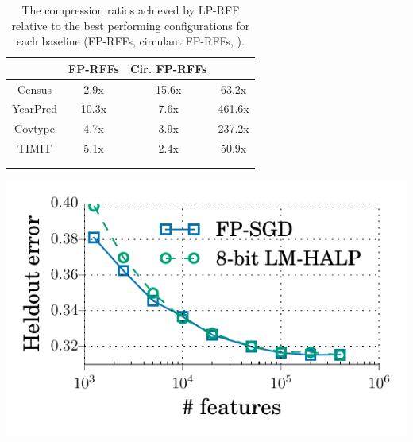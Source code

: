 \begin{table}[ht]
\begin{minipage}{.57\linewidth}
\centering
	\begin{tabular}{c c c c}
		\toprule
		& FP-RFFs & Cir. FP-RFFs & \Nystrom \\
		\midrule
		Census & 2.9x & 15.6x & 63.2x \\
		YearPred & 10.3x & 7.6x & 461.6x \\ 
		Covtype & 4.7x & 3.9x & 237.2x \\ 
		TIMIT & 5.1x & 2.4x & 50.9x \\ 
		\bottomrule \\ \\
	\end{tabular}
	\caption{The compression ratios achieved by LP-RFF relative to the best performing configurations for each baseline (FP-RFFs, circulant FP-RFFs, \NystromNS).  %
	}
	\label{tab:mem_saving}
\end{minipage}
\hspace{0.15in}
\begin{minipage}{0.375\linewidth}
\vspace{-0.78em}
	\includegraphics[width=0.975\linewidth]{figures/timit_error_vs_n_feat_lm_halp.pdf}

\end{minipage}
\end{table}
